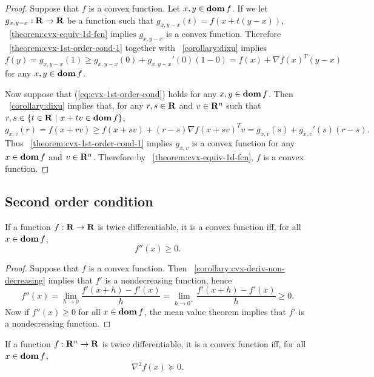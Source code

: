 \begin{proof}
Suppose that $f$ is a convex function.
Let $x,y\in\mathop{\bf dom} f$.
If we let $g_{x,y-x}:\mathbf{R}\to\mathbf{R}$ be a function such that $g_{x,y-x}(t) = f(x+t(y-x))$,
\theoremname~\ref{theorem:cvx-equiv-1d-fcn} implies $g_{x,y-x}$ is a convex function.
Therefore \theoremname~\ref{theorem:cvx-1st-order-cond-1} together with \corollaryname~\ref{corollary:dixu}
implies
\[
f(y) = g_{x,y-x}(1) \geq g_{x,y-x}(0) + g_{x,y-x}'(0) (1-0)
= f(x) + \nabla f(x) ^T (y-x)
\]
for any $x,y \in \mathop{\bf dom} f$.

Now suppose that (\ref{eq:cvx-1st-order-cond}) holds for any $x,y \in \mathop{\bf dom} f$.
Then \corollaryname~\ref{corollary:dixu} implies that,
for any $r,s\in\mathbf{R}$ and $v\in\mathbf{R}^n$ such that $r,s\in\{t\in\mathbf{R}~|~x+tv\in\mathop{\bf dom} f\}$,
\[
g_{x,v}(r) = f(x+rv) \geq f(x+sv) + (r-s) \nabla f(x+sv)^T v = g_{x,v}(s) + g_{x,v}'(s)(r-s).
\]
Thus \theoremname~\ref{theorem:cvx-1st-order-cond-1} implies
$g_{x,v}$ is a convex function for any $x\in\mathop{\bf dom} f$ and $v\in\mathbf{R}^n$.
Therefore by \theoremname~\ref{theorem:cvx-equiv-1d-fcn}, $f$ is a convex function.
\end{proof}

\subsection{Second order condition}

\begin{theorem}
\label{theorem:cvx-2nd-order-cond-1}
If a function $f:\mathbf{R}\to\mathbf{R}$ is twice differentiable, it is a convex function iff, for all $x \in \mathop{\bf dom} f$,
\begin{equation}
\label{eq:cvx-2nd-order-cond-1}
        f''(x) \geq 0.
\end{equation}
\end{theorem}

\begin{proof}
Suppose that $f$ is a convex function.
Then \corollaryname~\ref{corollary:cvx-deriv-non-decreasing} implies that $f'$ is a nondecreasing function,
hence
\[
f''(x)
= \lim_{h\to0} \frac{f'(x+h) - f'(x)}{h}
= \lim_{h\to0^+} \frac{f'(x+h) - f'(x)}{h} \geq 0.
\]
Now if $f''(x)\geq0$ for all $x\in\mathop{\bf dom} f$, the mean value theorem implies that $f'$ is a nondecreasing function.
\end{proof}


\begin{theorem}
\label{theorem:cvx-2nd-order-cond}
If a function $f:\mathbf{R}^n\to\mathbf{R}$ is twice differentiable, it is a convex function iff, for all $x \in \mathop{\bf dom} f$,
\begin{equation}
\label{eq:cvx-2nd-order-cond}
        \nabla^2 f(x) \succeq 0.
\end{equation}
\end{theorem}

